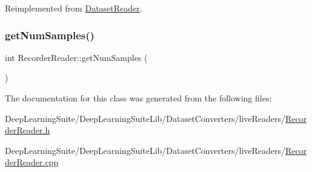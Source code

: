 Reimplemented from \hyperlink{class_dataset_reader_af50668f52c34f4620c44e91f26dd11ce}{Dataset\+Reader}.

\mbox{\label{class_recorder_reader_a5aba35af024680621c7af019049f0b6e}} 
\subsubsection{\texorpdfstring{get\+Num\+Samples()}{getNumSamples()}}
{\footnotesize\ttfamily int Recorder\+Reader\+::get\+Num\+Samples (\begin{DoxyParamCaption}{ }\end{DoxyParamCaption})}



The documentation for this class was generated from the following files\+:\begin{DoxyCompactItemize}
\item 
Deep\+Learning\+Suite/\+Deep\+Learning\+Suite\+Lib/\+Dataset\+Converters/live\+Readers/\hyperlink{_recorder_reader_8h}{Recorder\+Reader.\+h}\item 
Deep\+Learning\+Suite/\+Deep\+Learning\+Suite\+Lib/\+Dataset\+Converters/live\+Readers/\hyperlink{_recorder_reader_8cpp}{Recorder\+Reader.\+cpp}\end{DoxyCompactItemize}
